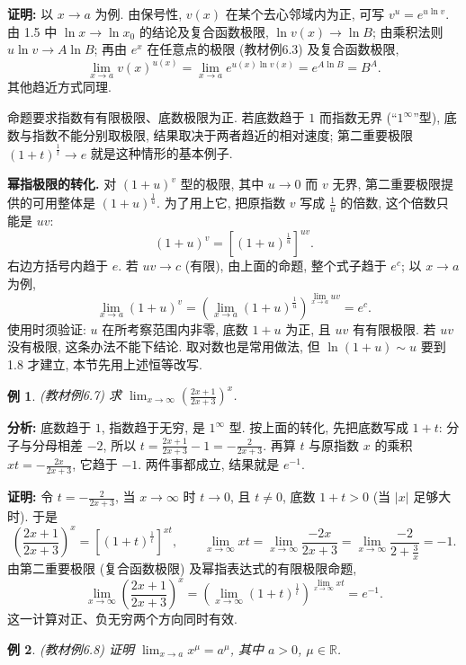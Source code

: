 \documentclass[UTF8,openany]{ctexbook}
\theoremstyle{chinesetextbook}
\newtheorem{example}{例}[section]
\newenvironment{cnproof}{\par\indent\textbf{证明:} \ignorespaces}{\par}
\begin{document}
\begin{cnproof}
以 $x\to a$ 为例. 由保号性, $v(x)$ 在某个去心邻域内为正, 可写 $v^u=e^{u\ln v}$. 由 1.5 中 $\ln x\to\ln x_0$ 的结论及复合函数极限, $\ln v(x)\to\ln B$; 由乘积法则 $u\ln v\to A\ln B$; 再由 $e^x$ 在任意点的极限 (教材例6.3) 及复合函数极限,
\[
\lim_{x\to a}v(x)^{u(x)}=\lim_{x\to a}e^{u(x)\ln v(x)}=e^{A\ln B}=B^A.
\]
其他趋近方式同理.
\end{cnproof}
命题要求指数有有限极限、底数极限为正. 若底数趋于 $1$ 而指数无界 (“$1^\infty$”型), 底数与指数不能分别取极限, 结果取决于两者趋近的相对速度; 第二重要极限 $\displaystyle(1+t)^{\frac1t}\to e$ 就是这种情形的基本例子.
\par\indent\textbf{幂指极限的转化.} 对 $(1+u)^v$ 型的极限, 其中 $u\to0$ 而 $v$ 无界, 第二重要极限提供的可用整体是 $\displaystyle(1+u)^{\frac1u}$. 为了用上它, 把原指数 $v$ 写成 $\displaystyle\frac1u$ 的倍数, 这个倍数只能是 $uv$:
\[
(1+u)^v=\left[(1+u)^{\frac1u}\right]^{uv}.
\]
右边方括号内趋于 $e$. 若 $uv\to c$ (有限), 由上面的命题, 整个式子趋于 $e^c$; 以 $x\to a$ 为例,
\[
\lim_{x\to a}(1+u)^v=\left(\lim_{x\to a}(1+u)^{\frac1u}\right)^{\lim\limits_{x\to a}uv}=e^{c}.
\]
使用时须验证: $u$ 在所考察范围内非零, 底数 $1+u$ 为正, 且 $uv$ 有有限极限. 若 $uv$ 没有极限, 这条办法不能下结论. 取对数也是常用做法, 但 $\ln(1+u)\sim u$ 要到 1.8 才建立, 本节先用上述恒等改写.
\begin{example}
\textnormal{(教材例6.7)} 求 $\displaystyle \lim_{x\to\infty}\left(\frac{2x+1}{2x+3}\right)^x$.
\end{example}
\par\indent\textbf{分析:} 底数趋于 $1$, 指数趋于无穷, 是 $1^\infty$ 型. 按上面的转化, 先把底数写成 $1+t$: 分子与分母相差 $-2$, 所以 $\displaystyle t=\frac{2x+1}{2x+3}-1=-\frac2{2x+3}$. 再算 $t$ 与原指数 $x$ 的乘积 $\displaystyle xt=-\frac{2x}{2x+3}$, 它趋于 $-1$. 两件事都成立, 结果就是 $e^{-1}$.
\begin{cnproof}
令 $\displaystyle t=-\frac2{2x+3}$, 当 $x\to\infty$ 时 $t\to0$, 且 $t\ne0$, 底数 $1+t>0$ (当 $|x|$ 足够大时). 于是
\[
\left(\frac{2x+1}{2x+3}\right)^x=\left[(1+t)^{\frac1t}\right]^{xt},
\qquad
\lim_{x\to\infty}xt=\lim_{x\to\infty}\frac{-2x}{2x+3}=\lim_{x\to\infty}\frac{-2}{2+\frac3x}=-1.
\]
由第二重要极限 (复合函数极限) 及幂指表达式的有限极限命题,
\[
\lim_{x\to\infty}\left(\frac{2x+1}{2x+3}\right)^x
=\left(\lim_{x\to\infty}(1+t)^{\frac1t}\right)^{\lim\limits_{x\to\infty}xt}=e^{-1}.
\]
这一计算对正、负无穷两个方向同时有效.
\end{cnproof}
\begin{example}
\textnormal{(教材例6.8)} 证明 $\displaystyle \lim_{x\to a}x^\mu=a^\mu$, 其中 $a>0$, $\mu\in\mathbb R$.
\end{example}
\end{document}
